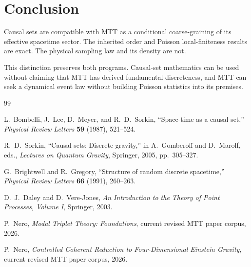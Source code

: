 \documentclass[11pt]{article}
\theoremstyle{definition}
\theoremstyle{remark}
\begin{document}
\section{Conclusion}

Causal sets are compatible with MTT as a conditional coarse-graining of its
effective spacetime sector. The inherited order and Poisson local-finiteness
results are exact. The physical sampling law and its density are not.

This distinction preserves both programs. Causal-set mathematics can be used
without claiming that MTT has derived fundamental discreteness, and MTT can
seek a dynamical event law without building Poisson statistics into its
premises.

\begin{thebibliography}{99}

L.~Bombelli, J.~Lee, D.~Meyer, and R.~D.~Sorkin,
``Space-time as a causal set,''
\emph{Physical Review Letters} \textbf{59} (1987), 521--524.

R.~D.~Sorkin,
``Causal sets: Discrete gravity,''
in A.~Gomberoff and D.~Marolf, eds.,
\emph{Lectures on Quantum Gravity},
Springer, 2005, pp.~305--327.

G.~Brightwell and R.~Gregory,
``Structure of random discrete spacetime,''
\emph{Physical Review Letters} \textbf{66} (1991), 260--263.

D.~J.~Daley and D.~Vere-Jones,
\emph{An Introduction to the Theory of Point Processes, Volume I},
Springer, 2003.

P.~Nero,
\emph{Modal Triplet Theory: Foundations},
current revised MTT paper corpus, 2026.

P.~Nero,
\emph{Controlled Coherent Reduction to Four-Dimensional Einstein Gravity},
current revised MTT paper corpus, 2026.

\end{thebibliography}
\end{document}
